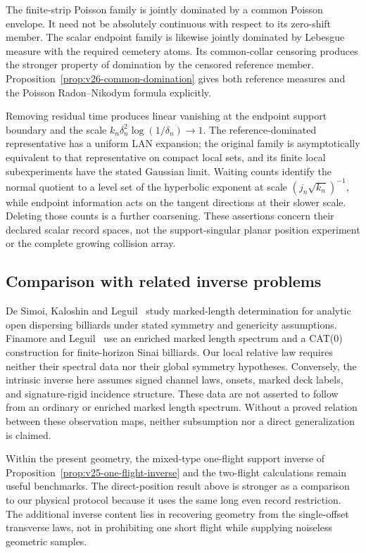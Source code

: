 The finite-strip Poisson family is jointly dominated by a common Poisson
envelope.  It need not be absolutely continuous with respect to its
zero-shift member.  The scalar endpoint family is likewise jointly dominated
by Lebesgue measure with the required cemetery atoms.  Its common-collar
censoring produces the stronger property of domination by the censored
reference member.  Proposition~\ref{prop:v26-common-domination} gives both
reference measures and the Poisson Radon--Nikodym formula explicitly.

Removing residual time produces linear vanishing at the endpoint support
boundary and the scale \(k_n\delta_n^2\log(1/\delta_n)\to1\).
The reference-dominated representative has a uniform LAN expansion; the
original family is asymptotically equivalent to that representative on
compact local sets, and its finite local subexperiments have the stated
Gaussian limit.  Waiting counts identify the normal quotient to a level
set of the hyperbolic exponent at scale \((j_n\sqrt{k_n})^{-1}\), while
endpoint information acts on the tangent directions at their slower scale.
Deleting those counts is a further coarsening.  These assertions concern
their declared scalar record spaces, not the support-singular planar
position experiment or the complete growing collision array.

\subsection{Comparison with related inverse problems}

De Simoi, Kaloshin and Leguil~\cite{DSKL} study marked-length determination
for analytic open dispersing billiards under stated symmetry and genericity
assumptions.  Finamore and Leguil~\cite{FinamoreLeguil} use an enriched
marked length spectrum and a CAT(0) construction for finite-horizon Sinai
billiards.  Our local relative law requires neither their spectral data nor
their global symmetry hypotheses.  Conversely, the intrinsic inverse here
assumes signed channel laws, onsets, marked deck labels, and signature-rigid
incidence structure.  These data are not asserted to follow from an ordinary
or enriched marked length spectrum.  Without a proved relation between
these observation maps, neither subsumption nor a direct generalization
is claimed.

Within the present geometry, the mixed-type one-flight support inverse of
Proposition~\ref{prop:v25-one-flight-inverse} and the two-flight calculations
remain useful benchmarks.  The direct-position result above is stronger as
a comparison to our physical protocol because it uses the same long even
record restriction.  The additional inverse content lies in recovering
geometry from the single-offset transverse laws, not in prohibiting one
short flight while supplying noiseless geometric samples.

